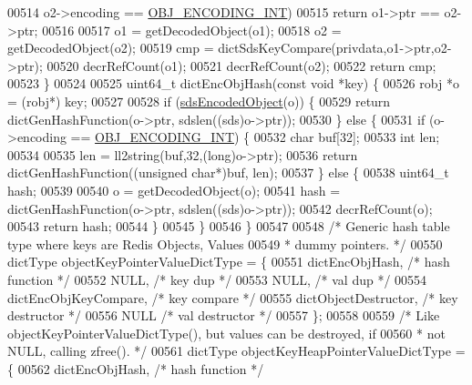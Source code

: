 \begin{DoxyCode}
{{{{{00514         o2->encoding == \hyperlink{server_8h_ae934cf008a0be0ef009c92c2d006a816}{OBJ\_ENCODING\_INT})
00515             \textcolor{keywordflow}{return} o1->ptr == o2->ptr;
00516 
00517     o1 = getDecodedObject(o1);
00518     o2 = getDecodedObject(o2);
00519     cmp = dictSdsKeyCompare(privdata,o1->ptr,o2->ptr);
00520     decrRefCount(o1);
00521     decrRefCount(o2);
00522     \textcolor{keywordflow}{return} cmp;
00523 \}
00524 
00525 uint64\_t dictEncObjHash(\textcolor{keyword}{const} \textcolor{keywordtype}{void} *key) \{
00526     robj *o = (robj*) key;
00527 
00528     \textcolor{keywordflow}{if} (\hyperlink{server_8h_afcfb5bd97af52d1dbce331745cae030c}{sdsEncodedObject}(o)) \{
00529         \textcolor{keywordflow}{return} dictGenHashFunction(o->ptr, sdslen((sds)o->ptr));
00530     \} \textcolor{keywordflow}{else} \{
00531         \textcolor{keywordflow}{if} (o->encoding == \hyperlink{server_8h_ae934cf008a0be0ef009c92c2d006a816}{OBJ\_ENCODING\_INT}) \{
00532             \textcolor{keywordtype}{char} buf[32];
00533             \textcolor{keywordtype}{int} len;
00534 
00535             len = ll2string(buf,32,(\textcolor{keywordtype}{long})o->ptr);
00536             \textcolor{keywordflow}{return} dictGenHashFunction((\textcolor{keywordtype}{unsigned} \textcolor{keywordtype}{char}*)buf, len);
00537         \} \textcolor{keywordflow}{else} \{
00538             uint64\_t hash;
00539 
00540             o = getDecodedObject(o);
00541             hash = dictGenHashFunction(o->ptr, sdslen((sds)o->ptr));
00542             decrRefCount(o);
00543             \textcolor{keywordflow}{return} hash;
00544         \}
00545     \}
00546 \}
00547 
00548 \textcolor{comment}{/* Generic hash table type where keys are Redis Objects, Values}
00549 \textcolor{comment}{ * dummy pointers. */}
00550 dictType objectKeyPointerValueDictType = \{
00551     dictEncObjHash,            \textcolor{comment}{/* hash function */}
00552     NULL,                      \textcolor{comment}{/* key dup */}
00553     NULL,                      \textcolor{comment}{/* val dup */}
00554     dictEncObjKeyCompare,      \textcolor{comment}{/* key compare */}
00555     dictObjectDestructor,      \textcolor{comment}{/* key destructor */}
00556     NULL                       \textcolor{comment}{/* val destructor */}
00557 \};
00558 
00559 \textcolor{comment}{/* Like objectKeyPointerValueDictType(), but values can be destroyed, if}
00560 \textcolor{comment}{ * not NULL, calling zfree(). */}
00561 dictType objectKeyHeapPointerValueDictType = \{
00562     dictEncObjHash,            \textcolor{comment}{/* hash function */}
}}}}}
\end{DoxyCode}
